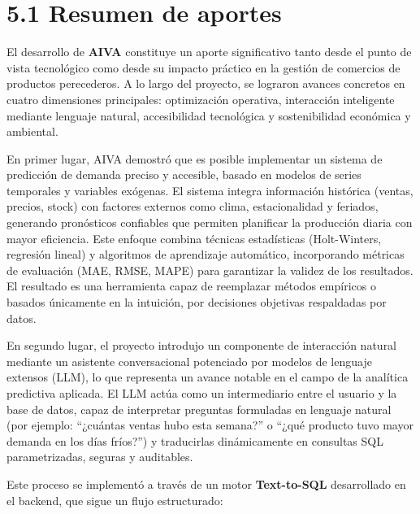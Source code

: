 \section*{5.1 Resumen de aportes}

El desarrollo de \textbf{AIVA} constituye un aporte significativo tanto desde el punto de vista tecnológico como desde su impacto práctico en la gestión de comercios de productos perecederos. 
A lo largo del proyecto, se lograron avances concretos en cuatro dimensiones principales: optimización operativa, interacción inteligente mediante lenguaje natural, accesibilidad tecnológica y sostenibilidad económica y ambiental.

En primer lugar, AIVA demostró que es posible implementar un sistema de predicción de demanda preciso y accesible, basado en modelos de series temporales y variables exógenas. 
El sistema integra información histórica (ventas, precios, stock) con factores externos como clima, estacionalidad y feriados, generando pronósticos confiables que permiten planificar la producción diaria con mayor eficiencia. 
Este enfoque combina técnicas estadísticas (Holt-Winters, regresión lineal) y algoritmos de aprendizaje automático, incorporando métricas de evaluación (MAE, RMSE, MAPE) para garantizar la validez de los resultados. 
El resultado es una herramienta capaz de reemplazar métodos empíricos o basados únicamente en la intuición, por decisiones objetivas respaldadas por datos.

En segundo lugar, el proyecto introdujo un componente de interacción natural mediante un asistente conversacional potenciado por modelos de lenguaje extensos (LLM), lo que representa un avance notable en el campo de la analítica predictiva aplicada. 
El LLM actúa como un intermediario entre el usuario y la base de datos, capaz de interpretar preguntas formuladas en lenguaje natural (por ejemplo: ``¿cuántas ventas hubo esta semana?'' o ``¿qué producto tuvo mayor demanda en los días fríos?'') y traducirlas dinámicamente en consultas SQL parametrizadas, seguras y auditables. 

Este proceso se implementó a través de un motor \textbf{Text-to-SQL} desarrollado en el backend, que sigue un flujo estructurado:

